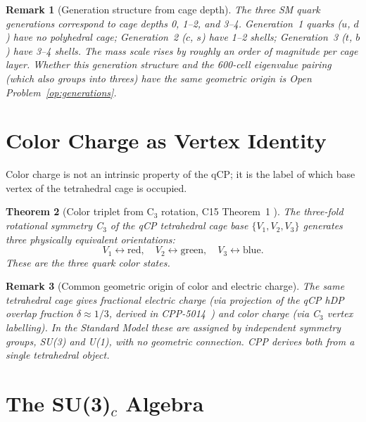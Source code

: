 \documentclass[11pt,a4paper]{article}
\newtheorem{theorem}{Theorem}[section]
\newtheorem{remark}[theorem]{Remark}
\begin{document}
\begin{remark}[Generation structure from cage depth]
The three SM quark generations correspond to cage depths 0, 1--2,
and 3--4.  Generation~1 quarks ($u$, $d$) have no polyhedral cage;
Generation~2 ($c$, $s$) have 1--2 shells; Generation~3 ($t$, $b$)
have 3--4 shells.  The mass scale rises by roughly an order of
magnitude per cage layer.  Whether this generation structure and the
600-cell eigenvalue pairing (which also groups into threes) have
the same geometric origin is Open Problem~\ref{op:generations}.
\end{remark}

\section{Color Charge as Vertex Identity}
\label{sec:color}

Color charge is not an intrinsic property of the qCP; it is the
label of which base vertex of the tetrahedral cage is occupied.

\begin{theorem}[Color triplet from C$_3$ rotation, C15 Theorem~1 \citep{c15}]
\label{thm:color_triplet}
The three-fold rotational symmetry C$_3$ of the qCP tetrahedral
cage base $\{V_1, V_2, V_3\}$ generates three physically equivalent
orientations:
\begin{equation}
V_1 \leftrightarrow \text{red},\quad
V_2 \leftrightarrow \text{green},\quad
V_3 \leftrightarrow \text{blue}.
\label{eq:color_assign}
\end{equation}
These are the three quark color states.
\end{theorem}

\begin{remark}[Common geometric origin of color and electric charge]
The same tetrahedral cage gives fractional electric charge (via
projection of the qCP hDP overlap fraction $\delta \approx 1/3$,
derived in CPP-5014~\citep{cpp5014}) and color charge (via
C$_3$ vertex labelling).  In the Standard Model these are assigned
by independent symmetry groups, SU(3) and U(1), with no geometric
connection.  CPP derives both from a single tetrahedral object.
\end{remark}

\section{The SU(3)$_c$ Algebra}
\label{sec:su3}
\end{document}
